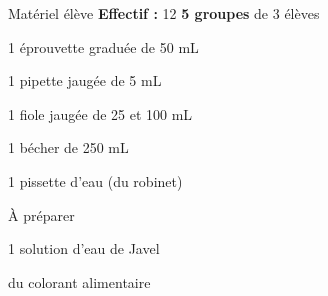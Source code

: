 
\begin{boiteMateriel}{Matériel élève}
  \textbf{Effectif :} 12
  \qq{}\qq{}
  \flecheLongue \textbf{5 groupes} de 3 élèves

  \begin{multicols}{2}
    \begin{protocole}
      \item 1 éprouvette graduée de 50 mL
      \item 1 pipette jaugée de 5 mL
      \item 1 fiole jaugée de 25 et 100 mL
      \item 1 bécher de 250 mL
      \item 1 pissette d'eau (du robinet)
    \end{protocole}
  \end{multicols}
\end{boiteMateriel}


\begin{boiteMateriel}{À préparer}
  \begin{protocole}
    \item 1 solution d'eau de Javel
    \item du colorant alimentaire
  \end{protocole}
\end{boiteMateriel}